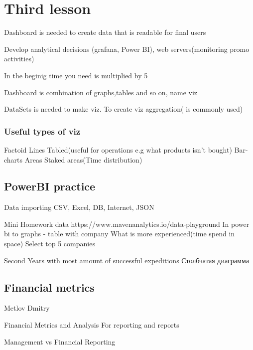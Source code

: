 \documentclass[12pt, a4paper, oneside]{article}
\begin{document}
\subsubsection{}
\subsubsection{}

\section{Third lesson}

Dashboard is needed to create data that is readable for final users

Develop analytical decisions (grafana, Power BI), web servers(monitoring promo activities)

In the beginig time you need is multiplied by 5


Dashboard is combination of graphs,tables and so on, name viz

DataSets is needed to make viz. To create viz aggregation( is commonly used)

\subsubsection{Useful types of viz}
Factoid 
Lines
Tabled(useful for operations e.g what products isn't bought)
Bar-charts
Areas
Staked areas(Time distribution) 

\subsection{PowerBI practice}

Data importing
CSV, Excel, DB, Internet, JSON


 Mini Homework 
data https://www.mavenanalytics.io/data-playground
In power bi to graphs - table with company
What is more experienced(time spend in space)
Select top 5 companies

Second
Years with most amount of successful  expeditions
Столбчатая диаграмма

\subsection{Financial metrics}
Metlov Dmitry


Financial Metrics and Analysis 
For reporting and reports

Management vs Financial Reporting
\end{document}
